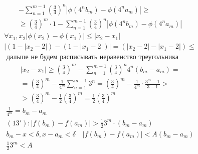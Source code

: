 \documentclass[main]{subfiles}
\begin{document}
\begin{example}
\begin{multline*}
          -\sum_{n=1}^{m-1} \left( \frac{3}{4} \right)^n | \phi(4^nb_m) - \phi(4^na_m)| \geq \\
           \geq   \left( \frac{3}{4} \right)^m \cdot 1 
          - \sum^{m-1}_{n=1} \left( \frac{3}{4} \right)^n |\phi(4^nb_m)-\phi(4^na_m)|\end{multline*}
          \begin{gather*}
          \forall x_1, x_2 |\phi(x_2) - \phi(x_1)| \leq |x_2 -x_1| \tag{12} \\
          |(1-|x_2-2|) - (1-|x_1-2|)| = (|x_2-2| - |x_1-2|) \leq \\
          \text{ дальше не будем расписывать неравенство треугольника} 
          \end{gather*}
          \begin{multline*}
 |x_2-x_1|\geq \left( \frac{3}{4} \right)^m - \sum_{n=1}^{m-1} \left( \frac{3}{4} \right)^n
          4^n(b_m - a_m) =\\
          = \left( \frac{3}{4} \right)^m - \frac{1}{4^m} \sum_{n=1}^{m-1}3^n =
          \left( \frac{3}{4} \right)^m - \frac{1}{4^m} \cdot \frac{3^m-1}{3-1} > \\ 
          > \left( \frac{3}{4} \right)^m - \frac{1}{2} \left( \frac{3}{4} \right)^m
          = \frac{1}{2} \left( \frac{3}{4} \right)^m \tag{13} \end{multline*}
          \begin{gather*}
          \frac{1}{4^m} = b_m - a_m \\
          (13\prime) : |f(b_m) - f(a_m)| > \frac{1}{2} 3^m \cdot (b_m-a_m) \\
          b_m - x < \delta, x - a_m < \delta \quad |f(b_m) - f(a_m)| < A (b_m-a_m) \\
          \frac{1}{2} 3^m < A
     \end{gather*} 
     
\end{example}
\end{document}
